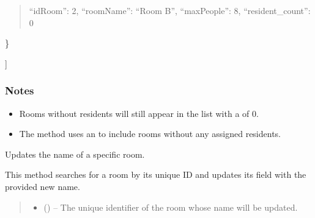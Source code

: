 \documentclass[letterpaper,10pt,english]{sphinxmanual}
\begin{document}
\begin{fulllineitems}
\begin{fulllineitems}
\begin{description}
\begin{description}
\begin{quote}
\sphinxAtStartPar
“idRoom”: 2,
“roomName”: “Room B”,
“maxPeople”: 8,
“resident\_count”: 0
\end{quote}

\sphinxAtStartPar
\}

\end{description}

\sphinxAtStartPar
{]}

\end{description}
\subsubsection*{Notes}
\begin{itemize}
\item {} 
\sphinxAtStartPar
Rooms without residents will still appear in the list with a  of 0.

\item {} 
\sphinxAtStartPar
The method uses an  to include rooms without any assigned residents.

\end{itemize}

\end{fulllineitems}


\begin{fulllineitems}
\label{\detokenize{app.controllers:app.controllers.room_controller.RoomController.updateRoomName}}
\pysigstartsignatures
\pysiglinewithargsret
{}
{\sphinxparamcomma {}\sphinxparamcomma {}}
{}
\pysigstopsignatures
\sphinxAtStartPar
Updates the name of a specific room.

\sphinxAtStartPar
This method searches for a room by its unique ID and updates its  field
with the provided new name.
\begin{quote}\begin{description}
\begin{itemize}
\item {} 
\sphinxAtStartPar
{} () – The unique identifier of the room whose name will be updated.


\end{itemize}
\end{description}
\end{quote}
\end{fulllineitems}
\end{fulllineitems}
\end{document}
